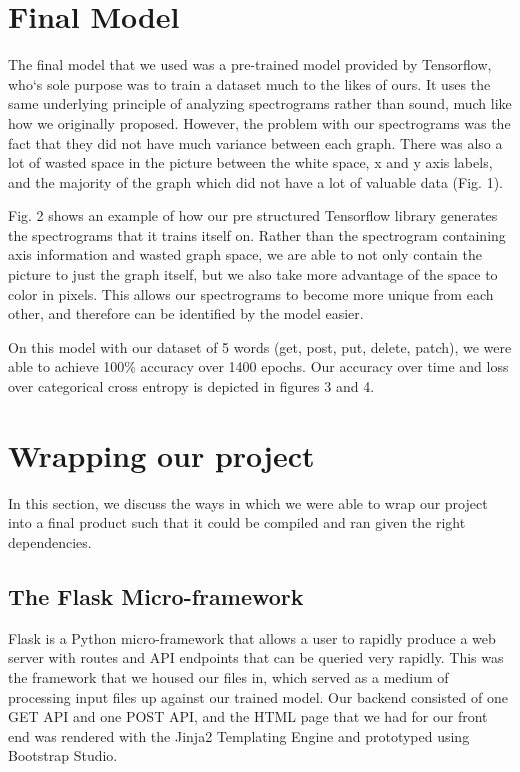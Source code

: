 \documentclass[12pt,journal,compsoc]{IEEEtran}
\begin{document}
\section{Final Model}

The final model that we used was a pre-trained model provided by Tensorflow, who`s sole purpose was to train a dataset much to the likes of ours. It uses the same underlying principle of analyzing spectrograms rather than sound, much like how we originally proposed. However, the problem with our spectrograms was the fact that they did not have much variance between each graph. There was also a lot of wasted space in the picture between the white space, x and y axis labels, and the majority of the graph which did not have a lot of valuable data (Fig. 1). 

Fig. 2 shows an example of how our pre structured Tensorflow library generates the spectrograms that it trains itself on. Rather than the spectrogram containing axis information and wasted graph space, we are able to not only contain the picture to just the graph itself, but we also take more advantage of the space to color in pixels. This allows our spectrograms to become more unique from each other, and therefore can be identified by the model easier. 

On this model with our dataset of 5 words (get, post, put, delete, patch), we were able to achieve 100\% accuracy over 1400 epochs. Our accuracy over time and loss over categorical cross entropy is depicted in figures 3 and 4. 

\section{Wrapping our project}
In this section, we discuss the ways in which we were able to wrap our project into a final product such that it could be compiled and ran given the right dependencies. 

\subsection{The Flask Micro-framework}
Flask is a Python micro-framework that allows a user to rapidly produce a web server with routes and API endpoints that can be queried very rapidly. This was the framework that we housed our files in, which served as a medium of processing input files up against our trained model. Our backend consisted of one GET API and one POST API, and the HTML page that we had for our front end was rendered with the Jinja2 Templating Engine and prototyped using Bootstrap Studio. 
\end{document}
